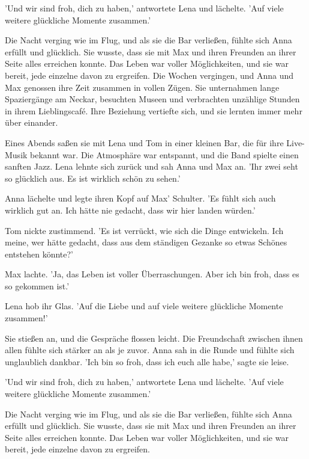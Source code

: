 \documentclass[12pt]{article}
\begin{document}
'Und wir sind froh, dich zu haben,' antwortete Lena und lächelte. 'Auf viele weitere glückliche Momente zusammen.'

Die Nacht verging wie im Flug, und als sie die Bar verließen, fühlte sich Anna erfüllt und glücklich. Sie wusste, dass sie mit Max und ihren Freunden an ihrer Seite alles erreichen konnte. Das Leben war voller Möglichkeiten, und sie war bereit, jede einzelne davon zu ergreifen. Die Wochen vergingen, und Anna und Max genossen ihre Zeit zusammen in vollen Zügen. Sie unternahmen lange Spaziergänge am Neckar, besuchten Museen und verbrachten unzählige Stunden in ihrem Lieblingscafé. Ihre Beziehung vertiefte sich, und sie lernten immer mehr über einander.

Eines Abends saßen sie mit Lena und Tom in einer kleinen Bar, die für ihre Live-Musik bekannt war. Die Atmosphäre war entspannt, und die Band spielte einen sanften Jazz. Lena lehnte sich zurück und sah Anna und Max an. 'Ihr zwei seht so glücklich aus. Es ist wirklich schön zu sehen.'

Anna lächelte und legte ihren Kopf auf Max' Schulter. 'Es fühlt sich auch wirklich gut an. Ich hätte nie gedacht, dass wir hier landen würden.'

Tom nickte zustimmend. 'Es ist verrückt, wie sich die Dinge entwickeln. Ich meine, wer hätte gedacht, dass aus dem ständigen Gezanke so etwas Schönes entstehen könnte?'

Max lachte. 'Ja, das Leben ist voller Überraschungen. Aber ich bin froh, dass es so gekommen ist.'

Lena hob ihr Glas. 'Auf die Liebe und auf viele weitere glückliche Momente zusammen!'

Sie stießen an, und die Gespräche flossen leicht. Die Freundschaft zwischen ihnen allen fühlte sich stärker an als je zuvor. Anna sah in die Runde und fühlte sich unglaublich dankbar. 'Ich bin so froh, dass ich euch alle habe,' sagte sie leise.

'Und wir sind froh, dich zu haben,' antwortete Lena und lächelte. 'Auf viele weitere glückliche Momente zusammen.'

Die Nacht verging wie im Flug, und als sie die Bar verließen, fühlte sich Anna erfüllt und glücklich. Sie wusste, dass sie mit Max und ihren Freunden an ihrer Seite alles erreichen konnte. Das Leben war voller Möglichkeiten, und sie war bereit, jede einzelne davon zu ergreifen.

\clearpage
\end{document}
